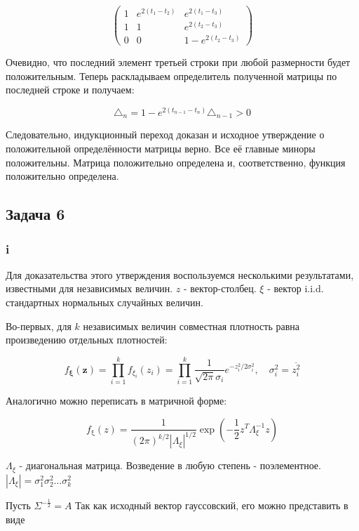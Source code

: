 \documentclass[a4paper,12pt]{article}
\begin{document}
\[ \begin{pmatrix} 
1 & e^{2(t_1 - t_2)} & e^{2(t_1 - t_3)} \\
1 & 1 & e^{2(t_2 - t_3)}\\
0 & 0 & 1 -  e^{2(t_2 - t_3)}
\end{pmatrix}\]

Очевидно, что последний элемент третьей строки при любой размерности будет положительным. Теперь раскладываем определитель полученной матрицы по последней строке и получаем:

\[ \triangle_n = 1 - e^{2(t_{n-1} - t_{n})}  \triangle_{n-1} > 0 \]

Следовательно, индукционный переход доказан и исходное утверждение о положительной определённости матрицы верно. Все её главные миноры положительны. Матрица положительно определена и, соответственно, функция положительно определена.

\subsection{Задача 6}

\subsubsection{i}

Для доказательства этого утверждения воспользуемся несколькими результатами, известными для независимых величин. $ z $ - вектор-столбец. $ \xi $ - вектор i.i.d. стандартных нормальных случайных величин.

Во-первых, для $ k $ независимых величин совместная плотность равна произведению отдельных плотностей:


\[ f_{\mathbf{\xi}}(\mathbf{z})=\prod_{i=1}^{k} f_{\xi_{i}}\left(z_{i}\right)=\prod_{i=1}^{k} \frac{1}{\sqrt{2 \pi} \sigma_{i}} e^{-z_{i}^{2} / 2 \sigma_{i}^{2}}, \quad \sigma_{i}^{2}=\overline{z_{i}^{2}} \]


Аналогично можно переписать в матричной форме:

\[ f_{\mathrm{\xi}}(z)=\frac{1}{(2 \pi)^{k / 2}\left|\Lambda_{\xi}\right|^{1 / 2}} \exp \left(-\frac{1}{2} z^T \Lambda_{\xi}^{-1} z \right) \]

$ \Lambda_{\xi} $ - диагональная матрица. Возведение в любую степень - поэлементное.$  |\Lambda_{\xi}| = \sigma_{1}^{2} \sigma_{2}^{2} \ldots \sigma_{k}^{2} $


Пусть $ \Sigma^{-\frac{1}{2}} = A $ Так как исходный вектор гауссовский, его можно представить в виде 
\end{document}
